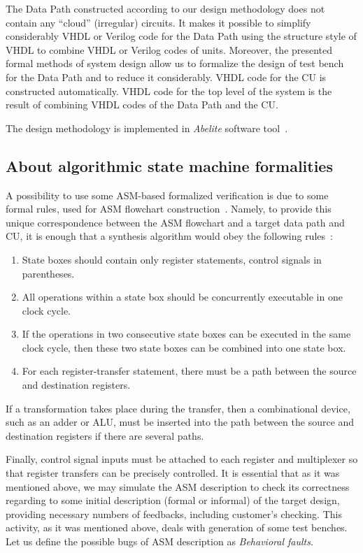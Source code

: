 \begin{multicols}{2}
   The Data Path constructed according to our design methodology does not contain any ``cloud'' (irregular)
circuits. It makes it possible to simplify considerably VHDL or Verilog code for the Data Path using the
structure style of VHDL to combine VHDL or Verilog codes of units. Moreover, the presented formal methods
of
system design allow us to formalize the design of test bench for the Data Path and to reduce it considerably.
VHDL code for the CU is constructed automatically. VHDL code for the top level of the system is the
result of combining VHDL codes of the Data Path and the CU.


   The design methodology is implemented in \textit{Abelite} software tool~\cite{26bar}.

       \subsection{About algorithmic state machine formalities} %

\noindent
A possibility to use some ASM-based formalized veri\-fi\-cation is due to some formal rules, used for ASM
flowchart construction~\cite{5bar, 26bar}.  Namely, to provide this unique correspondence between the ASM
flowchart and a target data path and CU, it is enough that a synthesis algorithm would obey the
following rules~\cite{5bar}:
\begin{enumerate}[1.]
\item  State boxes should contain only register statements, control signals in parentheses.
\item All operations within a state box should be con\-current\-ly executable in one clock cycle.
\item If the operations in two consecutive state boxes can be executed in the same clock cycle, then these two
state boxes can be combined into one state box.
\item  For each register-transfer statement, there must be a path between the source and destination registers.
\end{enumerate}

If a transformation takes place during the transfer, then a combinational device, such as an adder or ALU, must
be inserted into the path between the source and destination registers if there are several paths.

   Finally, control signal inputs must be attached to each register and multiplexer so that register transfers can
be precisely controlled.  It is essential that as it was mentioned above, we may simulate the ASM description to
check its correctness regarding to some initial description (formal or informal) of the target design, providing
necessary numbers of feedbacks, including customer's checking. This activity, as it was mentioned above, deals
with generation of some test benches. Let us define the possible bugs of ASM description as \textit{Behavioral
faults}.


\end{multicols}
